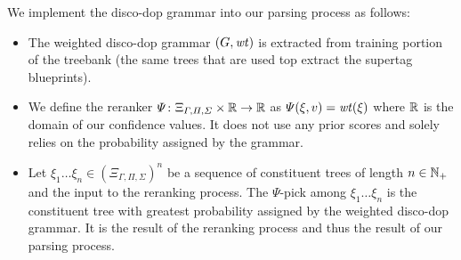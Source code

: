 \documentclass[../../document.tex]{subfiles}
\begin{document}
    We implement the disco-dop grammar into our parsing process as follows:
    \begin{itemize}
        \item The weighted disco-dop grammar \((G,\mathit{wt})\) is extracted from training portion of the treebank (the same trees that are used top extract the supertag blueprints).
        \item We define the reranker \(\varPsi\colon \Xi_{\varGamma, \varPi, \varSigma} \times \mathbb{R} \to \mathbb{R}\) as \(\varPsi(\xi, v) = \mathit{wt}(\xi)\) where \(\mathbb{R}\) is the domain of our confidence values. It does not use any prior scores and solely relies on the probability assigned by the grammar.
        \item Let \(\xi_1 \ldots \xi_n \in {(\Xi_{\varGamma, \varPi, \varSigma})}^n\) be a sequence of constituent trees of length \(n\in \mathbb{N}_+\) and the input to the reranking process.
        The \(\varPsi\)-pick among \(\xi_1 \ldots \xi_n\) is the constituent tree with greatest probability assigned by the weighted disco-dop grammar.
        It is the result of the reranking process and thus the result of our parsing process.
    \end{itemize}
\end{document}
